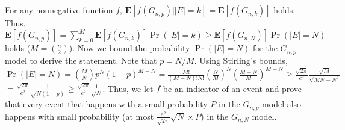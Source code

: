 \documentclass{article}
\begin{document}
\subsection{}
For any nonnegative function $f$, $\textbf{E}[f(G_{n,p})||E|=k]=\textbf{E}[f(G_{n,k})]$ holds.\\
Thus, $\textbf{E}[f(G_{n,p})]=\sum\limits_{k=0}^M\textbf{E}[f(G_{n,k})]\Pr(|E|=k) \geq \textbf{E}[f(G_{n,N})]\Pr(|E|=N)$ holds ($M=\binom{n}{2}$).
Now we bound the probability $\Pr(|E|=N)$ for the $G_{n,p}$ model to derive the statement.
Note that $p=N/M$. Using Stirling's bounds,\\
$\Pr(|E|=N)=\binom{M}{N}p^N(1-p)^{M-N}=\frac{M!}{(M-N)!N!}(\frac{N}{M})^N(\frac{M-N}{M})^{M-N}\geq \frac{\sqrt{2\pi}}{e^2}\frac{\sqrt{M}}{\sqrt{MN-N^2}}$
$=\frac{\sqrt{2\pi}}{e^2}\frac{1}{\sqrt{N(1-p)}}\geq\frac{\sqrt{2\pi}}{e^2}\frac{1}{\sqrt{N}}$.
Thus, we let $f$ be an indicator of an event and prove that every event that happens with a small probability $P$ in the $G_{n,p}$ model also happens with small probability (at most $\frac{e^2}{\sqrt{2\pi}}\sqrt{N}\times P$) in the $G_{n,N}$ model.
\subsection{}
\end{document}
